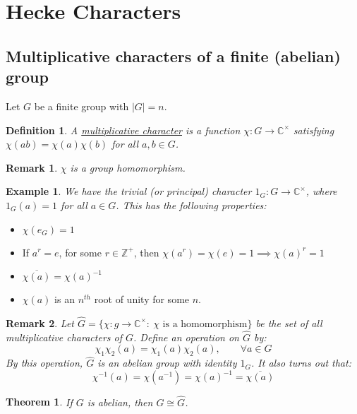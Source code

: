 \documentclass{article}
\newcommand{\C}{\mathbb{C}}
\newcommand{\Z}{\mathbb{Z}}
\newtheorem{theorem}{Theorem}[subsection]
\newtheorem{remark}{Remark}[subsection]
\newtheorem{example}{Example}[subsection]
\newtheorem{definition}{Definition}[subsection]
\begin{document}
\section{Hecke Characters}
\subsection{Multiplicative characters of a finite (abelian) group}
Let $G$ be a finite group with $|G|=n$. 
\begin{definition}
A \underline{multiplicative character} is a function $\chi: G\to \C^\times$ satisfying $\chi(ab)=\chi(a)\chi(b)$ for all $a,b\in G$.
\end{definition}
\begin{remark}
$\chi$ is a group homomorphism.
\end{remark}
\begin{example}
We have the trivial (or principal) character $1_G:G\to\C^\times$, where $1_G(a)=1$ for all $a\in G$. This has the following properties:
\end{example}
\begin{itemize}
    \item $\chi(e_G)=1$
    \item If $a^r=e$, for some $r\in\Z^+$, then $\chi(a^r)=\chi(e)=1\implies \chi(a)^r=1$
    \item $\overline{\chi(a)}=\chi(a)^{-1}$
    \item $\chi(a)$ is an $n^{th}$ root of unity for some $n$.
\end{itemize}
\begin{remark}
Let $\widehat{G}=\{\chi: g\to\C^\times:\ \chi\text{ is a homomorphism}\}$ be the set of all multiplicative characters of $G$. Define an operation on $\widehat{G}$ by:
$$\chi_1\chi_2(a)=\chi_1(a)\chi_2(a),\qquad\forall a\in G$$
By this operation, $\widehat{G}$ is an abelian group with identity $1_G$. It also turns out that:
$$\chi^{-1}(a)=\chi(a^{-1})=\chi(a)^{-1}=\overline{\chi(a)}$$
\end{remark}
\begin{theorem}
If $G$ is abelian, then $G\cong\widehat{G}$.
\end{theorem}
\end{document}
